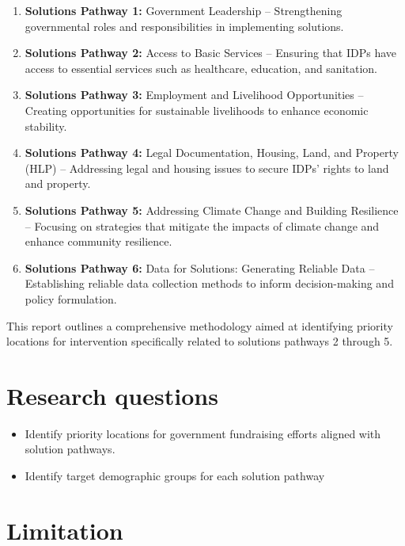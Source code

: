\documentclass[
]{report}
\providecommand{\tightlist}{%
  \setlength{\itemsep}{0pt}\setlength{\parskip}{0pt}}
\begin{document}
\begin{enumerate}
\def\labelenumi{\arabic{enumi}.}
\tightlist
\item
  \textbf{Solutions Pathway 1:} Government Leadership -- Strengthening
  governmental roles and responsibilities in implementing solutions.
\item
  \textbf{Solutions Pathway 2:} Access to Basic Services -- Ensuring
  that IDPs have access to essential services such as healthcare,
  education, and sanitation.
\item
  \textbf{Solutions Pathway 3:} Employment and Livelihood Opportunities
  -- Creating opportunities for sustainable livelihoods to enhance
  economic stability.
\item
  \textbf{Solutions Pathway 4:} Legal Documentation, Housing, Land, and
  Property (HLP) -- Addressing legal and housing issues to secure IDPs'
  rights to land and property.
\item
  \textbf{Solutions Pathway 5:} Addressing Climate Change and Building
  Resilience -- Focusing on strategies that mitigate the impacts of
  climate change and enhance community resilience.
\item
  \textbf{Solutions Pathway 6:} Data for Solutions: Generating Reliable
  Data -- Establishing reliable data collection methods to inform
  decision-making and policy formulation.
\end{enumerate}

This report outlines a comprehensive methodology aimed at identifying
priority locations for intervention specifically related to solutions
pathways 2 through 5.

\section{Research questions}\label{research-questions}

\begin{itemize}
\tightlist
\item
  Identify priority locations for government fundraising efforts aligned
  with solution pathways.
\item
  Identify target demographic groups for each solution pathway
\end{itemize}

\section{Limitation}\label{limitation}
\end{document}
